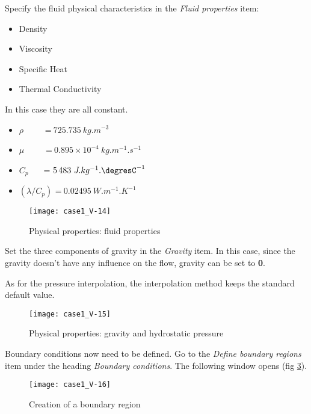 \clearpage
Specify the fluid physical characteristics in the {\itshape Fluid
properties} item:
\begin{itemize}
        \item Density
        \item Viscosity
        \item Specific Heat
        \item Thermal Conductivity
\end{itemize}

In this case they are all constant.
\begin{itemize}
        \item $\rho~\qquad$ =$~  725.735\ kg.m^{-3}$
        \item $\mu~\qquad$  =$~  0.895\times 10^{-4}\ kg.m^{-1}.s^{-1}$
        \item $C_p~~\quad$ =$~ 5\,483\ J.kg^{-1}.\mbox{\degresC}^{-1}$
        \item $(\lambda/C_p)$ =$~ 0.02495\ W.m^{-1}.K^{-1}$
\end{itemize}

\begin{figure}[ht]
\begin{center}
\texttt{[image: case1\_V-14]}
\caption{Physical properties: fluid properties}
\label{fig18_e1}
\end{center}
\end{figure}


\clearpage
Set the three components of gravity in the
{\itshape Gravity} item. In this case, since the gravity doesn't have any
influence on the flow, gravity can be set to {\bf 0}.

As for the pressure interpolation, the interpolation method keeps the standard
default value.

\begin{figure}[ht]
\begin{center}
\texttt{[image: case1\_V-15]}
\caption{Physical properties: gravity and hydrostatic pressure}
\label{fig19_e1}
\end{center}
\end{figure}


\clearpage
Boundary conditions now need to be defined. Go to the {\itshape Define
boundary regions} item under the heading {\itshape Boundary conditions}.
The following window opens (fig \ref{fig20_e1}).

\begin{figure}[ht]
\begin{center}
\texttt{[image: case1\_V-16]}
\caption{Creation of a boundary region}
\label{fig20_e1}
\end{center}
\end{figure}


